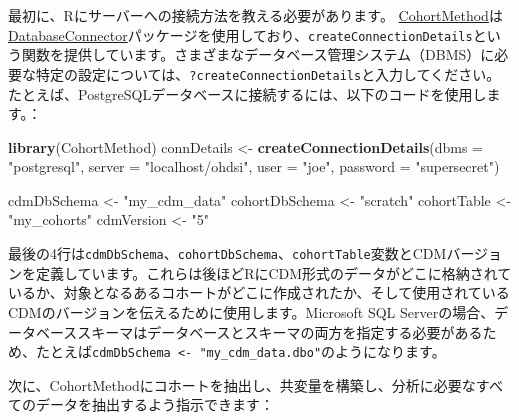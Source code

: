 \documentclass[
  11pt]{book}
\newenvironment{Shaded}{\begin{snugshade}}{\end{snugshade}}
\newcommand{\AttributeTok}[1]{\textcolor[rgb]{0.13,0.29,0.53}{#1}}
\newcommand{\FunctionTok}[1]{\textcolor[rgb]{0.13,0.29,0.53}{\textbf{#1}}}
\newcommand{\NormalTok}[1]{#1}
\newcommand{\OtherTok}[1]{\textcolor[rgb]{0.56,0.35,0.01}{#1}}
\newcommand{\StringTok}[1]{\textcolor[rgb]{0.31,0.60,0.02}{#1}}
\theoremstyle{definition}
\theoremstyle{definition}
\theoremstyle{definition}
\theoremstyle{definition}
\theoremstyle{remark}
\begin{document}
最初に、Rにサーバーへの接続方法を教える必要があります。 \href{https://ohdsi.github.io/CohortMethod/}{CohortMethod}は\href{https://ohdsi.github.io/DatabaseConnector/}{DatabaseConnector}パッケージを使用しており、\texttt{createConnectionDetails}という関数を提供しています。さまざまなデータベース管理システム（DBMS）に必要な特定の設定については、\texttt{?createConnectionDetails}と入力してください。たとえば、PostgreSQLデータベースに接続するには、以下のコードを使用します。：

\begin{Shaded}
\begin{Highlighting}[]
\FunctionTok{library}\NormalTok{(CohortMethod)}
\NormalTok{connDetails }\OtherTok{\textless{}{-}} \FunctionTok{createConnectionDetails}\NormalTok{(}\AttributeTok{dbms =} \StringTok{"postgresql"}\NormalTok{,}
                                       \AttributeTok{server =} \StringTok{"localhost/ohdsi"}\NormalTok{,}
                                       \AttributeTok{user =} \StringTok{"joe"}\NormalTok{,}
                                       \AttributeTok{password =} \StringTok{"supersecret"}\NormalTok{)}

\NormalTok{cdmDbSchema }\OtherTok{\textless{}{-}} \StringTok{"my\_cdm\_data"}
\NormalTok{cohortDbSchema }\OtherTok{\textless{}{-}} \StringTok{"scratch"}
\NormalTok{cohortTable }\OtherTok{\textless{}{-}} \StringTok{"my\_cohorts"}
\NormalTok{cdmVersion }\OtherTok{\textless{}{-}} \StringTok{"5"}
\end{Highlighting}
\end{Shaded}

最後の4行は\texttt{cdmDbSchema}、\texttt{cohortDbSchema}、\texttt{cohortTable}変数とCDMバージョンを定義しています。これらは後ほどRにCDM形式のデータがどこに格納されているか、対象となるあるコホートがどこに作成されたか、そして使用されているCDMのバージョンを伝えるために使用します。Microsoft SQL Serverの場合、データベーススキーマはデータベースとスキーマの両方を指定する必要があるため、たとえば\texttt{cdmDbSchema\ \textless{}-\ "my\_cdm\_data.dbo"}のようになります。

次に、CohortMethodにコホートを抽出し、共変量を構築し、分析に必要なすべてのデータを抽出するよう指示できます：
\end{document}
